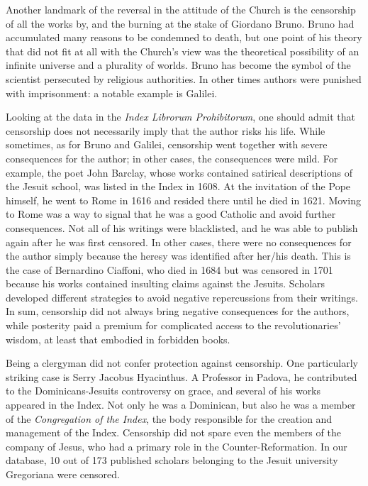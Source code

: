 Another landmark of the reversal in the attitude of the Church is the censorship of all the works by, and the burning at the stake of Giordano Bruno.
Bruno had accumulated many reasons to be condemned to death, but one point of his theory that did not fit at all with the Church's view was the theoretical possibility of an infinite universe and a plurality of worlds. Bruno has become the symbol of the scientist persecuted by religious authorities. In other times authors were punished with imprisonment: a notable example is Galilei.

Looking at the data in the \textit{Index Librorum Prohibitorum}, one should admit that censorship does not necessarily imply that the author risks his life. While sometimes, as for Bruno and Galilei, censorship went together with severe consequences for the author; in other cases, the consequences were mild. For example, the poet John Barclay, whose works contained satirical descriptions of the Jesuit school, was listed in the Index in 1608.  At the invitation of the Pope himself, he went to Rome in 1616 and resided there until he died in 1621. Moving to Rome was a way to signal that he was a good Catholic and avoid further consequences. Not all of his writings were blacklisted, and he was able to publish again after he was first censored. In other cases, there were no consequences for the author simply because the heresy was identified after her/his death. This is the case of Bernardino Ciaffoni, who %
died in 1684 but was censored in 1701 because his works contained insulting claims against the Jesuits. Scholars developed different strategies to avoid negative repercussions from their writings. In sum, censorship did not always bring negative consequences for the authors, while posterity paid a premium for complicated access to the revolutionaries' wisdom, at least that embodied in forbidden books.


Being a clergyman did not confer protection against censorship. One particularly striking case is Serry Jacobus Hyacinthus. A Professor in Padova, he contributed to the Dominicans-Jesuits controversy on grace, and several of his works appeared in the Index. Not only he was a Dominican, but also he was a member of the \textit{Congregation of the Index}, the body responsible for the creation and management of the Index. Censorship did not spare even the members of the company of Jesus, who had a primary role in the Counter-Reformation. In our database, 10 out of 173 published scholars belonging to the Jesuit university Gregoriana were censored. %

